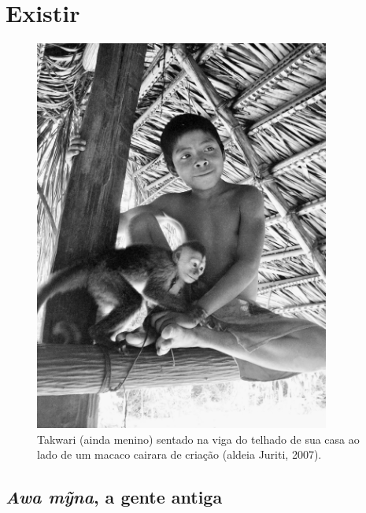 
\chapter*{Existir}\label{existir}

\begin{figure}[!ht]
\centering
\captionsetup{width=97mm}
  \includegraphics[width=97mm]{./imgs/100_4768}
\caption{Takwari (ainda menino) sentado na viga do telhado de sua casa ao lado de um
macaco cairara de criação (aldeia Juriti, 2007).}
\end{figure}

\section{\emph{Awa mỹna}, a gente antiga}\label{awa-mux1ef9na-a-gente-antiga}

